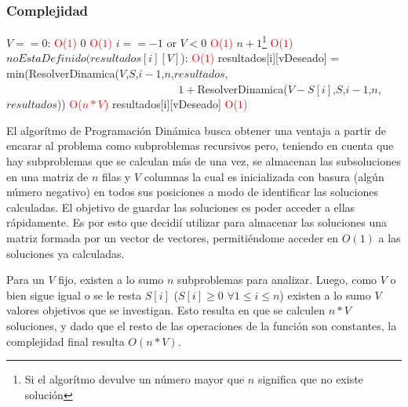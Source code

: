 \subsubsection{Complejidad}
\begin{codebox}
    \li \If $V == 0$: \textcolor{red}{O($1$)}
        \Then
         \li       \Return $0$ \textcolor{red}{O($1$)}
                \End
    \li \If $i == -1$ or $V<0$  \textcolor{red}{O($1$)}
        \Then
    \li                 \Return $n+1$\footnote{\label{bktrk}Si el algor\'itmo devulve un n\'umero mayor que $n$ significa que no existe soluci\'on} \textcolor{red}{O($1$)}
                \End
    \li \If $noEstaDefinido(resultados[i][V]$):  \textcolor{red}{O($1$)}
        \Then 
    \li          resultados[i][vDeseado] = min(ResolverDinamica($V$,$S$,$i-1$,$n$,$resultados$,
                            \\ $\qquad\qquad\qquad\qquad\qquad\qquad$$\qquad\quad\,\,$ $1+$ResolverDinamica($V-S[i]$,$S$,$i-1$,$n$,$resultados$)) \textcolor{red}{O($n*V$)}
                            \End
    \li \Return resultados[i][vDeseado]  \textcolor{red}{O($1$)}
    \end{codebox}
\par El algor\'itmo de Programaci\'on Din\'amica busca obtener una ventaja a partir de encarar al problema como
subproblemas recursivos pero, teniendo en cuenta que hay subproblemas que se calculan m\'as de una vez, se 
almacenan las subsoluciones  en una matriz de $n$ filas y $V$ columnas la cual es inicializada con basura (alg\'un n\'umero negativo)
en todos sus posiciones a modo de identificar las soluciones calculadas.
 El objetivo de guardar las soluciones es poder acceder a ellas
r\'apidamente. Es por esto que decidi\'i utilizar para almacenar las soluciones una matriz formada por un vector de 
vectores, permiti\'endome acceder en $O(1)$ a las soluciones ya calculadas.
\par Para un $V$ fijo, existen a lo sumo $n$ subproblemas para analizar. Luego, como $V$ o bien sigue igual o se le resta $S[i]$ ($S[i]\geq 0$ $\forall 1\leq i \leq n$)
existen a lo sumo $V$ valores objetivos que se investigan. Esto resulta en que se calculen $n*V$ soluciones, y dado que el resto de las operaciones de 
la funci\'on son constantes, la complejidad final resulta $O(n*V)$.
